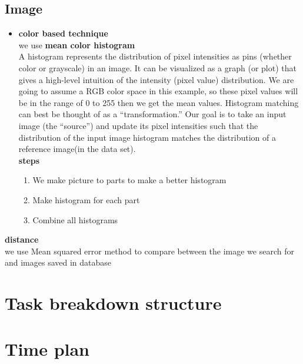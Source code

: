 \documentclass[pdftex,10pt,a4paper,oneside]{article}
\begin{document}
	\subsection{Image}
	\begin{itemize}
		\item \textbf{{\large color based technique}} \\
		we use \textbf{mean color histogram} \\
		A histogram represents the distribution of pixel intensities as pins (whether color or grayscale) in an image. It can be visualized as a graph (or plot) that gives a high-level intuition of the intensity (pixel value) distribution. We are going to assume a RGB color space in this example, so these pixel values will be in the range of 0 to 255 then we get the mean values.
		Histogram matching can best be thought of as a “transformation.” Our goal is to take an input image (the “source”) and update its pixel intensities such that the distribution of the input image histogram matches the distribution of a reference image(in the data set).\\
		\textbf{{\large steps}}\\
		\begin{enumerate}
			\item We make picture to parts to make a better histogram
			\item Make histogram for each part
			\item Combine all histograms 
		\end{enumerate}






	\end{itemize}

	
	\textbf{{\large distance}}\\
	we use Mean squared error method to compare between the image we search for and images saved in database 
	
	\pagebreak
	\section{Task breakdown structure}
		
	\pagebreak
	\section{Time plan}
\end{document}
